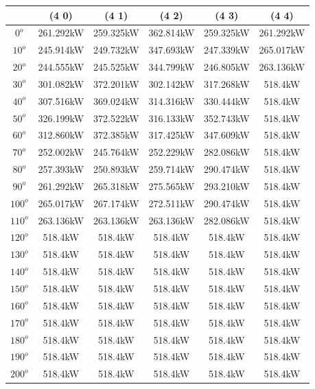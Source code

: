         \begin{table}[H]
        	\centering
        	\begin{tabular}{|c|c|c|c|c|c|} \hline
        			& (4 0)		& (4 1)		& (4 2)		& (4 3)		& (4 4)		\\ \hline
		$0^o$	& 261.292kW	& 259.325kW	& 362.814kW	& 259.325kW	& 261.292kW	\\ \hline
		$10^o$	& 245.914kW	& 249.732kW	& 347.693kW	& 247.339kW	& 265.017kW	\\ \hline
		$20^o$	& 244.555kW	& 245.525kW	& 344.799kW	& 246.805kW	& 263.136kW	\\ \hline
		$30^o$	& 301.082kW	& 372.201kW	& 302.142kW	& 317.268kW	& 518.4kW	\\ \hline
		$40^o$	& 307.516kW	& 369.024kW	& 314.316kW	& 330.444kW	& 518.4kW	\\ \hline
		$50^o$	& 326.199kW	& 372.522kW	& 316.133kW	& 352.743kW	& 518.4kW	\\ \hline
		$60^o$	& 312.860kW	& 372.385kW	& 317.425kW	& 347.609kW	& 518.4kW	\\ \hline
		$70^o$	& 252.002kW	& 245.764kW	& 252.229kW	& 282.086kW	& 518.4kW	\\ \hline
		$80^o$	& 257.393kW	& 250.893kW	& 259.714kW	& 290.474kW	& 518.4kW	\\ \hline
		$90^o$	& 261.292kW	& 265.318kW	& 275.565kW	& 293.210kW	& 518.4kW	\\ \hline
		$100^o$	& 265.017kW	& 267.174kW	& 272.511kW	& 290.474kW	& 518.4kW	\\ \hline
		$110^o$	& 263.136kW	& 263.136kW	& 263.136kW	& 282.086kW	& 518.4kW	\\ \hline
		$120^o$	& 518.4kW	& 518.4kW	& 518.4kW	& 518.4kW	& 518.4kW	\\ \hline
		$130^o$	& 518.4kW	& 518.4kW	& 518.4kW	& 518.4kW	& 518.4kW	\\ \hline
		$140^o$	& 518.4kW	& 518.4kW	& 518.4kW	& 518.4kW	& 518.4kW	\\ \hline
		$150^o$	& 518.4kW	& 518.4kW	& 518.4kW	& 518.4kW	& 518.4kW	\\ \hline
		$160^o$	& 518.4kW	& 518.4kW	& 518.4kW	& 518.4kW	& 518.4kW	\\ \hline
		$170^o$	& 518.4kW	& 518.4kW	& 518.4kW	& 518.4kW	& 518.4kW	\\ \hline
		$180^o$	& 518.4kW	& 518.4kW	& 518.4kW	& 518.4kW	& 518.4kW	\\ \hline
		$190^o$	& 518.4kW	& 518.4kW	& 518.4kW	& 518.4kW	& 518.4kW	\\ \hline
		$200^o$	& 518.4kW	& 518.4kW	& 518.4kW	& 518.4kW	& 518.4kW	\\ \hline

\end{tabular}
\end{table}
